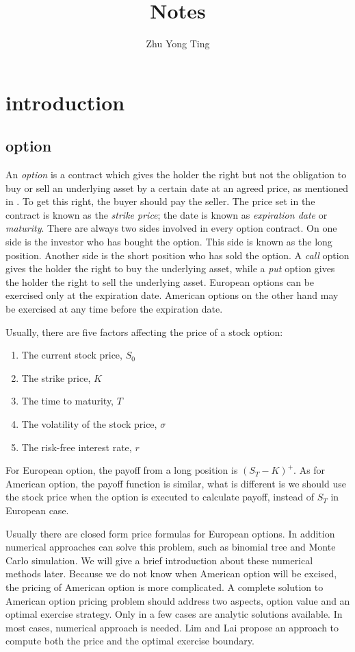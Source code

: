 \documentclass[11pt]{book}
\title{Notes}
\author{Zhu Yong Ting}
\begin{document}
\maketitle
\chapter{introduction}
\section{option}

An {\it option} is a contract which gives the holder the right but not the obligation to buy or sell an underlying asset by a certain date at an agreed price, as mentioned in \cite{Hull2008}.
To get this right, the buyer should pay the seller. The price set in the contract is known as the {\it strike price}; the date is known as {\it expiration date} or {\it maturity}. There are always two sides involved in every option contract. On one side is the investor who has bought the option. This side is known as the long position. Another side is the short position who has sold the option. A {\it call} option gives the holder the right to buy the underlying asset, while a {\it put} option gives the holder the right to sell the underlying asset. European options can be exercised only at the expiration date. American options on the other hand may be exercised at any time before the expiration date. 

Usually, there are five factors affecting the price of a stock option:
\begin{enumerate}[1.]
\item The current stock price, $S_0$
\item The strike price, $K$
\item The time to maturity, $T$
\item The volatility of the stock price, $\sigma$
\item The risk-free interest rate, $r$
\end{enumerate}

For European option, the payoff from a long position is $(S_T - K)^+$. As for American option, the payoff function is similar, what is different is we should use the stock price when the option is executed to calculate payoff, instead of $S_T$ in European case. 



Usually there are closed form price formulas for European options. In addition numerical approaches can solve this problem, such as binomial tree and Monte Carlo simulation. We will give a brief introduction about these numerical methods later. Because we do not know when American option will be excised, the pricing of American option is more complicated. A complete solution to American option pricing problem should address two aspects, option value and an optimal exercise strategy. Only in a few cases are analytic solutions available. In most cases, numerical approach is needed. Lim and Lai \cite{Lim2004} propose an approach to compute both the price and the optimal exercise boundary. 
\end{document}
